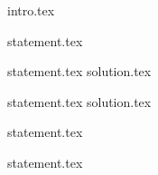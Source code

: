 {intro.tex}

{statement.tex}

{statement.tex}
{solution.tex}

{statement.tex}
{solution.tex}

{statement.tex}

{statement.tex}